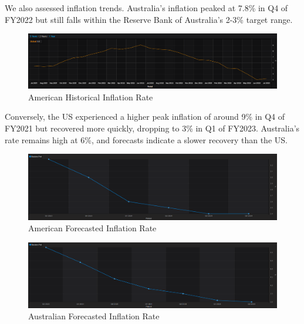 \documentclass{article}
\begin{document}
\noindent We also assessed inflation trends. Australia's inflation peaked at 7.8\% in Q4 of FY2022 but still falls within the Reserve Bank of Australia's 2-3\% target range. 

\begin{figure}[h!]
    \centering
    \includegraphics[scale=0.35]{graphs/USDinflation-historical.png}
    \caption{American Historical Inflation Rate}
    \label{American Historical Inflation Rate}
\end{figure}

\noindent Conversely, the US experienced a higher peak inflation of around 9\% in Q4 of FY2021 but recovered more quickly, dropping to 3\% in Q1 of FY2023. Australia's rate remains high at 6\%, and forecasts indicate a slower recovery than the US.\\

\begin{figure}[h!]
    \centering
    \includegraphics[scale=0.3]{graphs/USDinflation-forecast.png}
    \caption{American Forecasted Inflation Rate}
    \label{American Forecasted Inflation Rate}
\end{figure}

\begin{figure}[h!]
    \centering
    \includegraphics[scale=0.3]{graphs/AUDinflation-forecast.png}
    \caption{Australian Forecasted Inflation Rate}
    \label{Australian Forecasted Inflation Rate}
\end{figure}
\end{document}
